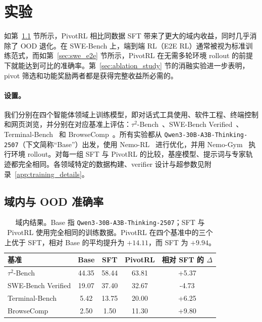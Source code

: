 \section{实验}
\label{sec:experiments}

如第~\ref{sec:indomain_ood_sft} 节所示，PivotRL 相比同数据 SFT 带来了更大的域内收益，同时几乎消除了 OOD 退化。在 SWE-Bench 上，端到端 RL（E2E RL）通常被视为标准训练范式，而如第~\ref{sec:swe_e2e} 节所示，PivotRL 在无需多轮环境 rollout 的前提下就能达到可比的准确率。第~\ref{sec:ablation_study} 节的消融实验进一步表明，pivot 筛选和功能奖励两者都是获得完整收益所必需的。

\paragraph{设置。}
我们分别在四个智能体领域上训练模型，即对话式工具使用、软件工程、终端控制和网页浏览，并分别在对应基准上评估：$\tau^2$-Bench~\citep{barres2025tau2bench}、SWE-Bench Verified~\citep{jimenez2024swebench}、Terminal-Bench~\citep{tbench_2025} 和 BrowseComp~\citep{wei2025browsecompsimplechallengingbenchmark}。所有实验都从 \texttt{Qwen3-30B-A3B-Thinking-2507}（下文简称“Base”）出发，使用 Nemo-RL~\citep{nemo-rl} 进行优化，并用 Nemo-Gym~\citep{nemo-gym} 执行环境 rollout。对每一组 SFT 与 PivotRL 的比较，基座模型、提示词与专家轨迹都完全相同。各领域特定的数据构建、verifier 设计与超参数见附录~\ref{app:training_details}。

\subsection{域内与 OOD 准确率}
\label{sec:indomain_ood_sft}

\begin{table}[t]
\centering
\small
\begin{tabular}{lcccc}
\toprule
\textbf{基准} & \textbf{Base} & \textbf{SFT} & \textbf{PivotRL} & \textbf{相对 SFT 的 $\Delta$} \\
\midrule
$\tau^2$-Bench   & 44.35 & 58.44 & 63.81 & +5.37 \\
SWE-Bench Verified     & 19.07 & 37.40 & 32.67 & -4.73 \\
Terminal-Bench   & 5.42  & 13.75 & 20.00 & +6.25 \\
BrowseComp       & 2.50  & 1.50  & 11.30 & +9.80 \\
\bottomrule
\end{tabular}
\caption{
域内结果。Base 指 \texttt{Qwen3-30B-A3B-Thinking-2507}；SFT 与 PivotRL 使用完全相同的训练数据。PivotRL 在四个基准中的三个上优于 SFT，相对 Base 的平均提升为 $+14.11$，而 SFT 为 $+9.94$。
}
\label{tab:single_domain_main_results}
\end{table}

